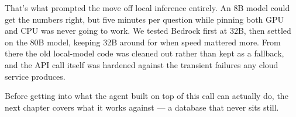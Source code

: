 That's what prompted the move off local inference entirely. An 8B model could
get the numbers right, but five minutes per question while pinning both GPU and
CPU was never going to work. We tested Bedrock first at 32B, then settled on the
80B model, keeping 32B around for when speed mattered more. From there the old
local-model code was cleaned out rather than kept as a fallback, and the API
call itself was hardened against the transient failures any cloud service
produces.

Before getting into what the agent built on top of this call can actually do,
the next chapter covers what it works against --- a database that never sits
still.



